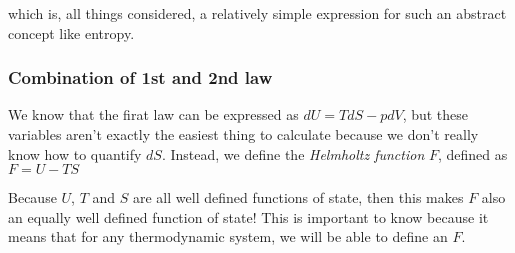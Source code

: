 which is, all things considered, a relatively simple expression for such an abstract concept like entropy. 

\subsubsection*{Combination of 1st and 2nd law}

We know that the firat law can be expressed as $dU = T dS - pdV$, but these variables aren't exactly the easiest thing to calculate because we don't really know how to quantify $dS$. Instead, we define the \textit{Helmholtz function} $F$, defined as $F = U - TS$

\begin{insight*}{}
    Because $U$, $T$ and $S$ are all well defined functions of state, then this makes $F$ also an equally well defined function of state! This is important to know because it means that for any thermodynamic system, we will be able to define an $F$. 
\end{insight*}

